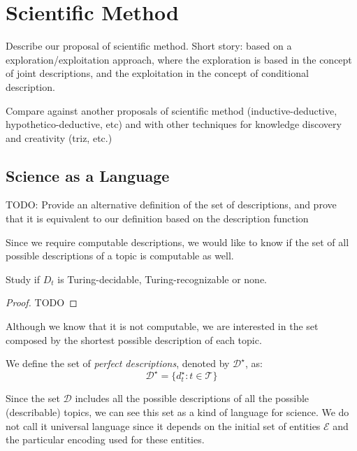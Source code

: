 %
%

\section{Scientific Method}

{\color{red} Describe our proposal of scientific method. Short story: based on a exploration/exploitation approach, where the exploration is based in the concept of joint descriptions, and the exploitation in the concept of conditional description.}

{\color{red} Compare against another proposals of scientific method (inductive-deductive, hypothetico-deductive, etc) and with other techniques for knowledge discovery and creativity (triz, etc.)}

\subsection{Science as a Language}

{\color{red} TODO: Provide an alternative definition of the set of descriptions, and prove that it is equivalent to our definition based on the description function}

Since we require computable descriptions, we would like to know if the set of all possible descriptions of a topic is computable as well.

\begin{proposition}
Study if $D_{t}$ is Turing-decidable, Turing-recognizable or none.
\end{proposition}
\begin{proof}
{\color{red} TODO}
\end{proof}

Although we know that it is not computable, we are interested in the set composed by the shortest possible description of each topic.

\begin{definition}
We define the set of \emph{perfect descriptions}, denoted by $\mathcal{D}^\star$, as:
\[
\mathcal{D}^\star = \{ d_t^\star : t \in \mathcal{T} \}
\]
\end{definition}

Since the set $\mathcal{D}$ includes all the possible descriptions of all the possible (describable) topics, we can see this set as a kind of language for science. We do not call it universal language since it depends on the initial set of entities $\mathcal{E}$ and the particular encoding used for these entities.

